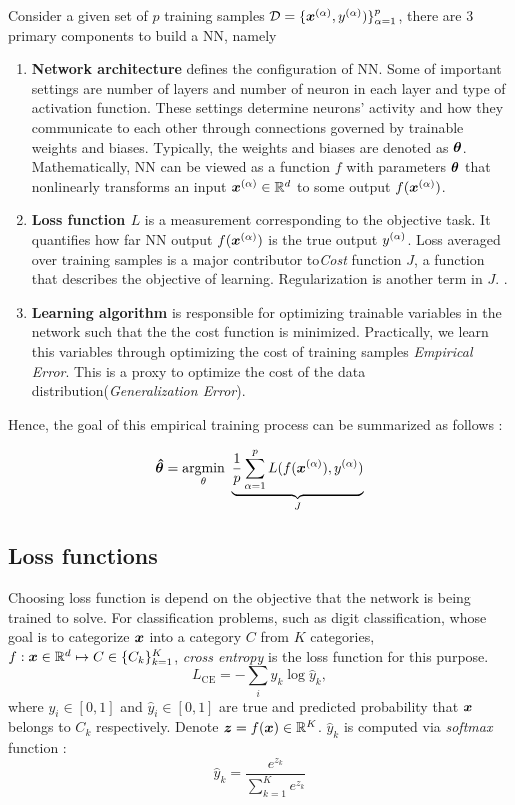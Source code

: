Consider a given set of $p$ training samples $\mathcal{D} = \{ \xa, \ya) \}_{\alpha=1}^{p}$,  there are 3 primary components to build a NN, namely  
\begin{enumerate}
	\item \textbf{Network architecture} defines the configuration of NN. Some of important settings are number of layers and number of neuron in each layer and type of activation function. These settings determine neurons' activity and how they communicate to each other through connections governed by trainable weights and biases. Typically, the weights and biases are denoted as $\patvector{\theta}$. Mathematically, NN can be viewed as a function $f$ with parameters $\patvector{\theta}$ that nonlinearly transforms an input $\xa\in \mathbb{R}^d $ to some output $f(\xa)$.
	\item \textbf{Loss function $L$}  is a measurement corresponding to the objective task. It quantifies how far NN output $f(\xa)$ is the true output $y^{(\alpha)}$. Loss averaged over training samples is a major contributor to\textit{Cost} function $J$, a function that describes the objective of learning. Regularization is another term in $J$. .
	\item \textbf{Learning algorithm} is responsible for optimizing trainable variables in the network such that the the cost function is minimized. Practically, we learn this variables through optimizing the cost of training samples \textit{Empirical Error}. This is a proxy to optimize the cost of the data distribution(\textit{Generalization Error}). 
\end{enumerate}

Hence, the goal of this empirical training process can be summarized as follows : 

\begin{align} \label{eq:nn_opt}
	\patvector{\hat{\theta}} = \patarg{min}{\theta} \underbrace{\frac{1}{p}  \sum_{\alpha=1}^p L( f(\xa), \ya) }_{J}
\end{align}

\subsection{Loss functions}
Choosing loss function is depend on the objective that the network is being trained to solve. For classification problems, such as digit classification, whose goal is to categorize $\boldsymbol{x}$ into a category $C$ from $K$ categories, $f : \boldsymbol{x} \in \mathbb{R}^d  \mapsto C \in \{ C_k \}_{k=1}^K$, \textit{cross entropy} is the loss function for this purpose.
$$
L_{\text{CE}} = - \sum_{i} y_k \log \hat{y}_k,
$$
where $y_i \in [0, 1]$ and $\hat{y}_i \in [0, 1]$ are true and predicted probability that $\boldsymbol{x}$ belongs to $C_k$ respectively. Denote $\patvector{z} = f(\x) \in \mathbb{R}^{K}$. $\hat{y}_k$ is computed via \textit{softmax} function :
$$
\hat{y}_k = \frac{e^{z_k}}{ \sum_{k=1}^K{e^{z_k}} }
$$ 


